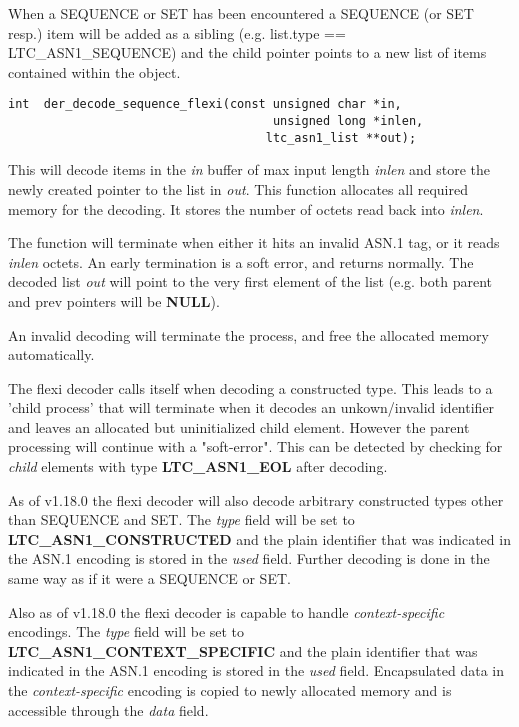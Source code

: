 \documentclass[synpaper]{book}
\begin{document}
When a SEQUENCE or SET has been encountered a SEQUENCE (or SET resp.) item will be added as a sibling (e.g. list.type == LTC\_ASN1\_SEQUENCE) and the child
pointer points to a new list of items contained within the object.

\begin{verbatim}
int  der_decode_sequence_flexi(const unsigned char *in,
                                     unsigned long *inlen,
                                    ltc_asn1_list **out);
\end{verbatim}

This will decode items in the \textit{in} buffer of max input length \textit{inlen} and store the newly created pointer to the list in \textit{out}.  This function allocates
all required memory for the decoding.  It stores the number of octets read back into \textit{inlen}.

The function will terminate when either it hits an invalid ASN.1 tag, or it reads \textit{inlen} octets.  An early termination is a soft error, and returns
normally.  The decoded list \textit{out} will point to the very first element of the list (e.g. both parent and prev pointers will be \textbf{NULL}).

An invalid decoding will terminate the process, and free the allocated memory automatically.

The flexi decoder calls itself when decoding a constructed type. This leads to
a 'child process' that will terminate when it decodes an unkown/invalid
identifier and leaves an allocated but uninitialized child element.
However the parent processing will continue with a "soft-error".
This can be detected by checking for \textit{child} elements with
type \textbf{LTC\_ASN1\_EOL} after decoding.

As of v1.18.0 the flexi decoder will also decode arbitrary constructed types
other than SEQUENCE and SET. The \textit{type} field will be set to
\textbf{LTC\_ASN1\_CONSTRUCTED} and the plain identifier that was indicated in the ASN.1
encoding is stored in the \textit{used} field. Further decoding is done in the
same way as if it were a SEQUENCE or SET.

Also as of v1.18.0 the flexi decoder is capable to handle
\textit{context-specific} encodings. The \textit{type} field will be set to
\textbf{LTC\_ASN1\_CONTEXT\_SPECIFIC} and the plain identifier that was indicated
in the ASN.1 encoding is stored in the \textit{used} field. Encapsulated data
in the \textit{context-specific} encoding is copied to newly allocated memory
and is accessible through the \textit{data} field.
\end{document}
